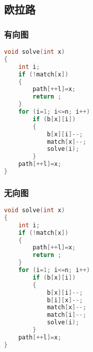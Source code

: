 \subsection{欧拉路}
	\subsubsection{有向图}
	\begin{lstlisting}[language=c++]
void solve(int x)
{
	int i;
	if (!match[x])
	{
		path[++l]=x;
		return ;
	}
	for (i=1; i<=n; i++)
		if (b[x][i])
		{
			b[x][i]--;
			match[x]--;
			solve(i);
		}
	path[++l]=x;
}
	\end{lstlisting}
	
	\subsubsection{无向图}
	\begin{lstlisting}[language=c++]
void solve(int x)
{
	int i;
	if (!match[x])
	{
		path[++l]=x;
		return ;
	}
	for (i=1; i<=n; i++)
		if (b[x][i])
		{
			b[x][i]--;
			b[i][x]--;
			match[x]--;
			match[i]--;
			solve(i);
		}
	path[++l]=x;
}
	\end{lstlisting}

